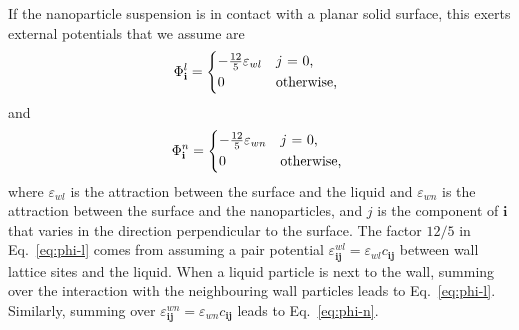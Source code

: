 \documentclass[journal=langd5,manuscript=article]{achemso}
\def\i{\mathbf{i}}
\def\j{\mathbf{j}}
\def\e{\varepsilon}
\begin{document}
If the nanoparticle suspension is in contact with a planar solid surface, this exerts external potentials that we assume are
%
\begin{equation}
  \Phi^l_\i=
    \begin{cases*}
      -\frac{12}{5}\e_{wl} & $j$ = 0,\\
      0 & otherwise,
    \end{cases*}\\
\label{eq:phi-l}
\end{equation}
%
and
%
\begin{equation}
  \Phi^n_\i=
    \begin{cases*}
      -\frac{12}{5}\e_{wn} & $j$ = 0,\\
      0 & otherwise,
    \end{cases*}
\label{eq:phi-n}
\end{equation}
%
where $\e_{wl}$ is the attraction between the surface and the liquid and
$\e_{wn}$ is the attraction between the surface and the nanoparticles,
and $j$ is the component of $\i$ that varies in the direction
perpendicular to the surface. The factor $12/5$ in
Eq.~\eqref{eq:phi-l} comes from assuming a pair potential
$\e^{wl}_{\i\j} = \e_{wl} c_{\i\j}$ between wall lattice sites and
the liquid. When a liquid particle is next to the wall, summing over
the interaction with the neighbouring wall particles leads
to Eq.~\eqref{eq:phi-l}. Similarly, summing over
$\e^{wn}_{\i\j} = \e_{wn} c_{\i\j}$ leads to
Eq.~\eqref{eq:phi-n}.
\end{document}
